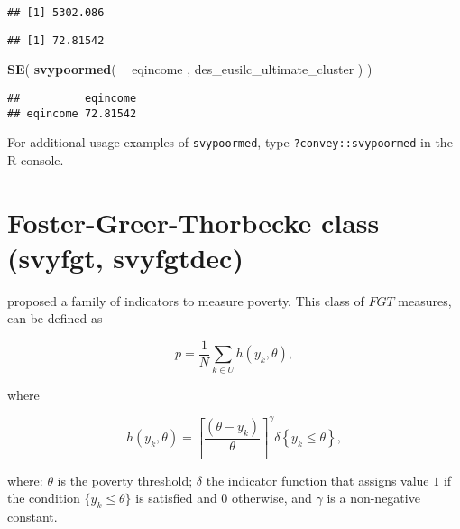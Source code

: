 \documentclass[]{book}
\newenvironment{Shaded}{\begin{snugshade}}{\end{snugshade}}
\newcommand{\CommentTok}[1]{\textcolor[rgb]{0.56,0.35,0.01}{\textit{#1}}}
\newcommand{\KeywordTok}[1]{\textcolor[rgb]{0.13,0.29,0.53}{\textbf{#1}}}
\newcommand{\NormalTok}[1]{#1}
\newcommand{\OperatorTok}[1]{\textcolor[rgb]{0.81,0.36,0.00}{\textbf{#1}}}
\newcommand{\StringTok}[1]{\textcolor[rgb]{0.31,0.60,0.02}{#1}}
\begin{document}
\begin{verbatim}
## [1] 5302.086
\end{verbatim}

\begin{Shaded}
\end{Shaded}

\begin{verbatim}
## [1] 72.81542
\end{verbatim}

\begin{Shaded}
\begin{Highlighting}[]
\KeywordTok{SE}\NormalTok{( }\KeywordTok{svypoormed}\NormalTok{( }\OperatorTok{~}\StringTok{ }\NormalTok{eqincome , des_eusilc_ultimate_cluster ) )}
\end{Highlighting}
\end{Shaded}

\begin{verbatim}
##          eqincome
## eqincome 72.81542
\end{verbatim}

For additional usage examples of \texttt{svypoormed}, type \texttt{?convey::svypoormed} in the R console.

\hypertarget{foster-greer-thorbecke-class-svyfgt-svyfgtdec}{%
\section{Foster-Greer-Thorbecke class (svyfgt, svyfgtdec)}\label{foster-greer-thorbecke-class-svyfgt-svyfgtdec}}

\citet{foster1984} proposed a family of indicators to measure poverty. This class of \(FGT\) measures, can be defined as

\[
p=\frac{1}{N}\sum_{k\in U}h(y_{k},\theta ), 
\]

where

\[
h(y_{k},\theta )=\left[ \frac{(\theta -y_{k})}{\theta }\right] ^{\gamma
}\delta \left\{ y_{k}\leq \theta \right\} , 
\]

where: \(\theta\) is the poverty threshold; \(\delta\) the indicator function that assigns value \(1\) if the condition \(\{y_{k}\leq \theta \}\) is satisfied and \(0\) otherwise, and \(\gamma\) is a non-negative constant.
\end{document}
